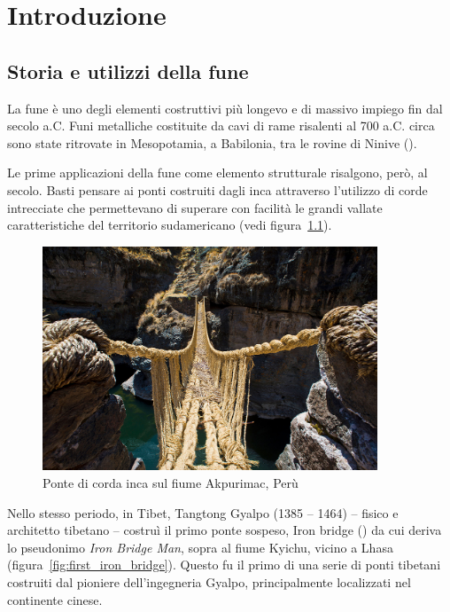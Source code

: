 \chapter{Introduzione}
\section{Storia e utilizzi della fune}
La fune è uno degli elementi costruttivi più longevo e di massivo impiego fin dal   secolo a.C. Funi metalliche costituite da cavi di rame risalenti al 700 a.C. circa sono state ritrovate in Mesopotamia, a Babilonia, tra le rovine di Ninive (\cite{costello:fune}).

Le prime applicazioni della fune come elemento strutturale risalgono, però, al  secolo.
Basti pensare ai ponti costruiti dagli inca attraverso l'utilizzo di corde intrecciate che permettevano di superare con facilità le grandi vallate caratteristiche del territorio sudamericano (vedi figura~\ref{fig:ponte_inca}).

\begin{figure}
	\centering
	\includegraphics[width=10cm]{Immagini/Ponte_Inca}
	\caption{Ponte di corda inca sul fiume Akpurimac, Perù}	
	\label{fig:ponte_inca}
\end{figure}

Nello stesso periodo, in Tibet, Tangtong Gyalpo (1385 -- 1464) -- fisico e architetto tibetano -- costruì il primo ponte sospeso, Iron bridge (\cite{cyrus:ponte}) da cui deriva lo pseudonimo \textit{Iron Bridge Man}, sopra al fiume Kyichu, vicino a Lhasa (figura~\ref{fig:first_iron_bridge}). Questo fu il primo di una serie di ponti tibetani costruiti dal pioniere dell'ingegneria Gyalpo, principalmente localizzati nel continente cinese.

